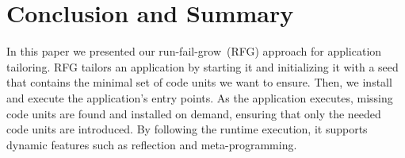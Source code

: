 %
%
%



\section{Conclusion and Summary}

In this paper we presented our run-fail-grow~(RFG) approach for application tailoring. RFG tailors an application by starting it and initializing it with a seed that contains the minimal set of code units we want to ensure. Then, we install and execute the application's entry points. As the application executes, missing code units are found and installed on demand, ensuring that only the needed code units are introduced. By following the runtime execution, it supports dynamic features such as reflection and meta-programming.

